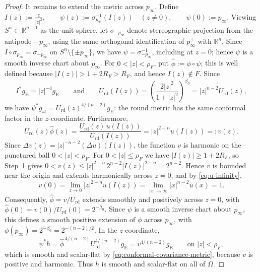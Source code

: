 \documentclass[12pt,oneside,a4paper]{article}
\theoremstyle{mytheorem}
\theoremstyle{remark}
\theoremstyle{definition}
\begin{document}
\begin{proof}
It remains to extend the metric across $p_\infty$.  Define
$I(z):=\frac{z}{|z|^2},\qquad
\psi(z):=\sigma_{p_\infty}^{-1}(I(z))\quad (z\ne0),\qquad
\psi(0):=p_\infty.$
Viewing $S^n\subset\mathbb R^{n+1}$ as the unit sphere, let
$\sigma_{-p_\infty}$ denote stereographic projection from the antipode
$-p_\infty$, using the same orthogonal identification of
$p_\infty^\perp$ with $\mathbb R^n$.  Since
$I\circ\sigma_{p_\infty}=\sigma_{-p_\infty}$ on
$S^n\setminus\{\pm p_\infty\}$, we have
$\psi=\sigma_{-p_\infty}^{-1}$, including at $z=0$; hence $\psi$ is a
smooth inverse chart about $p_\infty$.  For $0<|z|<\rho_F$, put
$\widehat\phi:=\phi\circ\psi$; this is well defined because
$|I(z)|>1+2R_F>R_F$, and hence $I(z)\notin F$.  Since
\[
 I^*g_{\mathrm E}=|z|^{-4}g_{\mathrm E}
 \qquad\text{and}\qquad
 U_{\mathrm{rd}}(I(z))
 =
 \left(\frac{2|z|^2}{1+|z|^2}\right)^{\beta_0}
 =
 |z|^{n-2}U_{\mathrm{rd}}(z),
\]
we have $\psi^*g_{st}=U_{\mathrm{rd}}(z)^{4/(n-2)}g_{\mathrm E}$: the round
metric has the same conformal factor in the $z$-coordinate.
Furthermore,
\[
 U_{\mathrm{rd}}(z)\widehat\phi(z)
 =
 \frac{U_{\mathrm{rd}}(z)\,u(I(z))}{U_{\mathrm{rd}}(I(z))}
 =
 |z|^{2-n}u(I(z))
 =:v(z).
\]
Since
$\Delta v(z)=|z|^{-n-2}(\Delta u)(I(z))$, the function $v$ is harmonic
on the punctured ball $0<|z|<\rho_F$.  For $0<|z|\le\rho_F$ we have
$|I(z)|\ge1+2R_F$, so Step~1 gives
\(0<v(z)
\le
|z|^{2-n}\,2^{n-2}|I(z)|^{2-n}
=
2^{n-2}\).
Hence $v$ is bounded near the origin and extends harmonically across
$z=0$, and by \eqref{eq:u-infinity},
\[
 v(0)
 =
 \lim_{z\to0}|z|^{2-n}u(I(z))
 =
 \lim_{|x|\to\infty}|x|^{n-2}u(x)
 =
 1.
\]
Consequently, $\widehat\phi=v/U_{\mathrm{rd}}$ extends smoothly and
positively across $z=0$, with
$\widehat\phi(0)=v(0)/U_{\mathrm{rd}}(0)=2^{-\beta_0}$.  Since $\psi$ is
a smooth inverse chart about $p_\infty$, this defines a smooth positive
extension of $\phi$ across $p_\infty$, with
$\phi(p_\infty)=2^{-\beta_0}=2^{-(n-2)/2}.$
In the $z$-coordinate,
\[
 \psi^*h
 =
 \widehat\phi^{\,4/(n-2)}U_{\mathrm{rd}}^{4/(n-2)}g_{\mathrm E}
 =
 v^{4/(n-2)}g_{\mathrm E}
 \qquad\text{on }|z|<\rho_F,
\]
which is smooth and scalar-flat by
\eqref{eq:conformal-covariance-metric}, because $v$ is positive and
harmonic.  Thus $h$ is smooth and scalar-flat on all of $\Omega$.


\end{proof}
\end{document}
